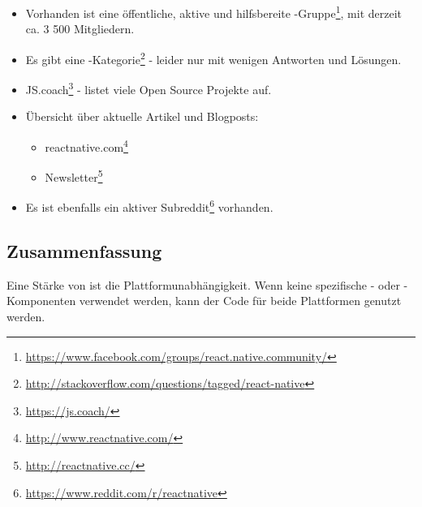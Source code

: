 \begin{itemize}
	\item Vorhanden ist eine öffentliche, aktive und hilfsbereite -Gruppe\footnote{\url{https://www.facebook.com/groups/react.native.community/}}, mit derzeit ca. 3 500 Mitgliedern.
	\item Es gibt eine -Kategorie\footnote{\url{http://stackoverflow.com/questions/tagged/react-native}} - leider nur mit wenigen Antworten und Lösungen.
	\item JS.coach\footnote{\url{https://js.coach/}} - listet viele Open Source Projekte auf.
	\item Übersicht über aktuelle Artikel und Blogposts: 
	\begin{itemize}
		\item reactnative.com\footnote{\url{http://www.reactnative.com/}}
		\item {} Newsletter\footnote{\url{http://reactnative.cc/}}
	\end{itemize}
	\item Es ist ebenfalls ein aktiver Subreddit\footnote{\url{https://www.reddit.com/r/reactnative}} vorhanden.
\end{itemize}


\subsection{Zusammenfassung}
Eine Stärke von  ist die Plattformunabhängigkeit. 
Wenn keine spezifische - oder -Komponenten verwendet werden, kann der Code für beide Plattformen genutzt werden.

